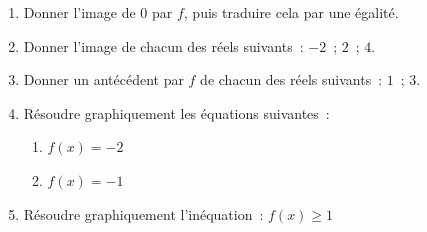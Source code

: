 \documentclass[12pt,a4paper]{article}
\begin{document}
\begin{enumerate}
  \item Donner l'image de $0$ par $f$, puis traduire cela par une égalité.
  \item Donner l'image de chacun des réels suivants~: $-2$~; $2$~; $4$.
  \item Donner un antécédent par $f$ de chacun des réels suivants~: $1$~; $3$.
  \item Résoudre graphiquement les équations suivantes~:
  \begin{enumerate}[label=\alph*.]
    \item $f(x) = -2$
    \item $f(x) = -1$
  \end{enumerate}
  \item Résoudre graphiquement l'inéquation~: $f(x) \geqslant 1$
\end{enumerate}
\end{document}
